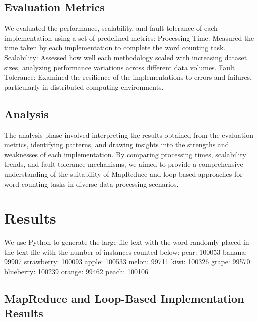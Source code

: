 \documentclass[]{acmsiggraph}
\begin{document}
\subsection{Evaluation Metrics}
We evaluated the performance, scalability, and fault tolerance of each implementation using a set of predefined metrics:
Processing Time: Measured the time taken by each implementation to complete the word counting task.
Scalability: Assessed how well each methodology scaled with increasing dataset sizes, analyzing performance variations across different data volumes.
Fault Tolerance: Examined the resilience of the implementations to errors and failures, particularly in distributed computing environments.
\subsection{Analysis}
The analysis phase involved interpreting the results obtained from the evaluation metrics, identifying patterns, and drawing insights into the strengths and weaknesses of each implementation. By comparing processing times, scalability trends, and fault tolerance mechanisms, we aimed to provide a comprehensive understanding of the suitability of MapReduce and loop-based approaches for word counting tasks in diverse data processing scenarios.

\section{Results}
We use Python to generate the large file text with the word randomly placed in the text file with the number of instances counted below:
pear: 100053
banana: 99907
strawberry: 100093
apple: 100533
melon: 99711
kiwi: 100326
grape: 99570
blueberry: 100239
orange: 99462
peach: 100106

\subsection{MapReduce and Loop-Based Implementation Results}
\end{document}
